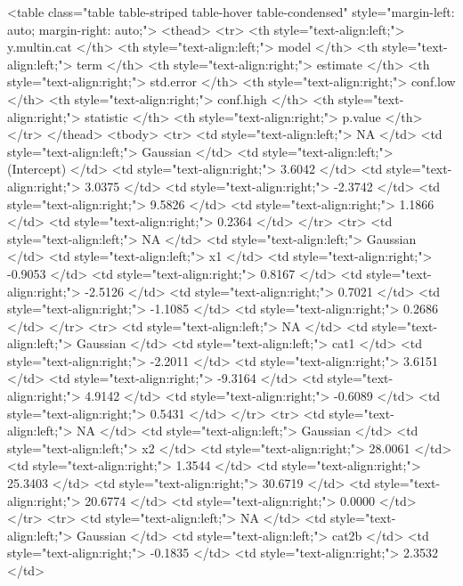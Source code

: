 \documentclass[a4paper]{article}
\begin{document}
\begin{HTML}
 <table class="table table-striped table-hover table-condensed" style="margin-left: auto; margin-right: auto;">
 <thead>
  <tr>
   <th style="text-align:left;"> y.multin.cat </th>
   <th style="text-align:left;"> model </th>
   <th style="text-align:left;"> term </th>
   <th style="text-align:right;"> estimate </th>
   <th style="text-align:right;"> std.error </th>
   <th style="text-align:right;"> conf.low </th>
   <th style="text-align:right;"> conf.high </th>
   <th style="text-align:right;"> statistic </th>
   <th style="text-align:right;"> p.value </th>
  </tr>
 </thead>
<tbody>
  <tr>
   <td style="text-align:left;"> NA </td>
   <td style="text-align:left;"> Gaussian </td>
   <td style="text-align:left;"> (Intercept) </td>
   <td style="text-align:right;"> 3.6042 </td>
   <td style="text-align:right;"> 3.0375 </td>
   <td style="text-align:right;"> -2.3742 </td>
   <td style="text-align:right;"> 9.5826 </td>
   <td style="text-align:right;"> 1.1866 </td>
   <td style="text-align:right;"> 0.2364 </td>
  </tr>
  <tr>
   <td style="text-align:left;"> NA </td>
   <td style="text-align:left;"> Gaussian </td>
   <td style="text-align:left;"> x1 </td>
   <td style="text-align:right;"> -0.9053 </td>
   <td style="text-align:right;"> 0.8167 </td>
   <td style="text-align:right;"> -2.5126 </td>
   <td style="text-align:right;"> 0.7021 </td>
   <td style="text-align:right;"> -1.1085 </td>
   <td style="text-align:right;"> 0.2686 </td>
  </tr>
  <tr>
   <td style="text-align:left;"> NA </td>
   <td style="text-align:left;"> Gaussian </td>
   <td style="text-align:left;"> cat1 </td>
   <td style="text-align:right;"> -2.2011 </td>
   <td style="text-align:right;"> 3.6151 </td>
   <td style="text-align:right;"> -9.3164 </td>
   <td style="text-align:right;"> 4.9142 </td>
   <td style="text-align:right;"> -0.6089 </td>
   <td style="text-align:right;"> 0.5431 </td>
  </tr>
  <tr>
   <td style="text-align:left;"> NA </td>
   <td style="text-align:left;"> Gaussian </td>
   <td style="text-align:left;"> x2 </td>
   <td style="text-align:right;"> 28.0061 </td>
   <td style="text-align:right;"> 1.3544 </td>
   <td style="text-align:right;"> 25.3403 </td>
   <td style="text-align:right;"> 30.6719 </td>
   <td style="text-align:right;"> 20.6774 </td>
   <td style="text-align:right;"> 0.0000 </td>
  </tr>
  <tr>
   <td style="text-align:left;"> NA </td>
   <td style="text-align:left;"> Gaussian </td>
   <td style="text-align:left;"> cat2b </td>
   <td style="text-align:right;"> -0.1835 </td>
   <td style="text-align:right;"> 2.3532 </td>

\end{HTML}
\end{document}
